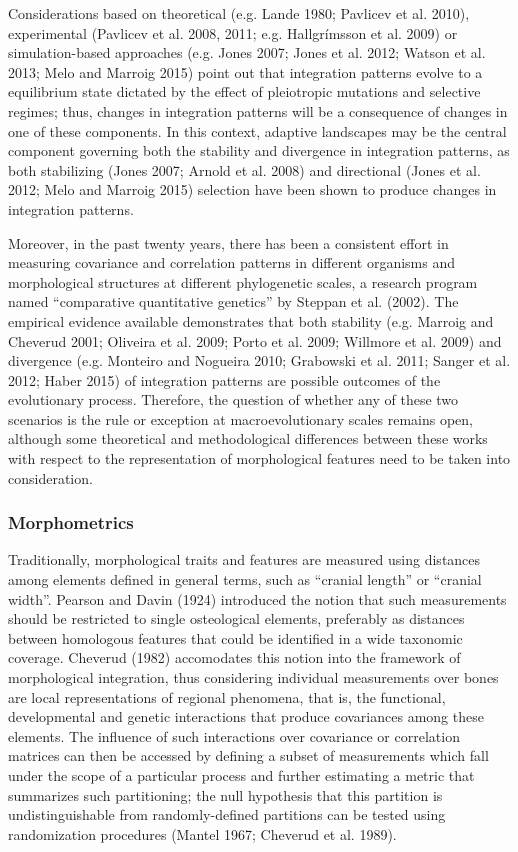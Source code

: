 \documentclass[12pt,]{article}
\begin{document}
Considerations based on theoretical (e.g. Lande 1980; Pavlicev et al.
2010), experimental (Pavlicev et al. 2008, 2011; e.g. Hallgrímsson et
al. 2009) or simulation-based approaches (e.g. Jones 2007; Jones et al.
2012; Watson et al. 2013; Melo and Marroig 2015) point out that
integration patterns evolve to a equilibrium state dictated by the
effect of pleiotropic mutations and selective regimes; thus, changes in
integration patterns will be a consequence of changes in one of these
components. In this context, adaptive landscapes may be the central
component governing both the stability and divergence in integration
patterns, as both stabilizing (Jones 2007; Arnold et al. 2008) and
directional (Jones et al. 2012; Melo and Marroig 2015) selection have
been shown to produce changes in integration patterns.

Moreover, in the past twenty years, there has been a consistent effort
in measuring covariance and correlation patterns in different organisms
and morphological structures at different phylogenetic scales, a
research program named ``comparative quantitative genetics'' by Steppan
et al. (2002). The empirical evidence available demonstrates that both
stability (e.g. Marroig and Cheverud 2001; Oliveira et al. 2009; Porto
et al. 2009; Willmore et al. 2009) and divergence (e.g. Monteiro and
Nogueira 2010; Grabowski et al. 2011; Sanger et al. 2012; Haber 2015) of
integration patterns are possible outcomes of the evolutionary process.
Therefore, the question of whether any of these two scenarios is the
rule or exception at macroevolutionary scales remains open, although
some theoretical and methodological differences between these works with
respect to the representation of morphological features need to be taken
into consideration.

\subsubsection{Morphometrics}\label{morphometrics}

Traditionally, morphological traits and features are measured using
distances among elements defined in general terms, such as ``cranial
length'' or ``cranial width''. Pearson and Davin (1924) introduced the
notion that such measurements should be restricted to single
osteological elements, preferably as distances between homologous
features that could be identified in a wide taxonomic coverage. Cheverud
(1982) accomodates this notion into the framework of morphological
integration, thus considering individual measurements over bones are
local representations of regional phenomena, that is, the functional,
developmental and genetic interactions that produce covariances among
these elements. The influence of such interactions over covariance or
correlation matrices can then be accessed by defining a subset of
measurements which fall under the scope of a particular process and
further estimating a metric that summarizes such partitioning; the null
hypothesis that this partition is undistinguishable from
randomly-defined partitions can be tested using randomization procedures
(Mantel 1967; Cheverud et al. 1989).
\end{document}
